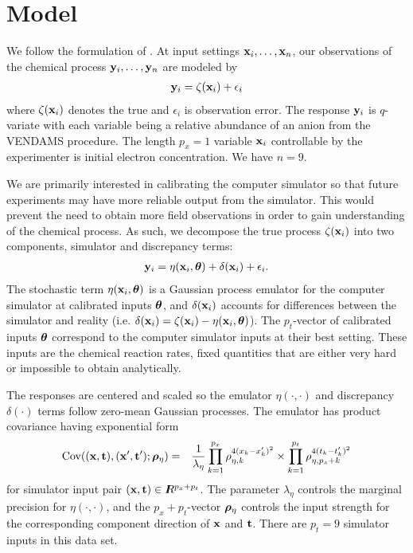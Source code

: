 \section{Model}

We follow the formulation of \cite{kennedy:2001}. At input settings $\mathbf{\bm{x}}_i,\ldots,\mathbf{\bm{x}}_n$, our observations of the chemical process $\mathbf{\bm{y}}_i,\ldots,\mathbf{\bm{y}}_n$ are modeled by
\begin{eqnarray}
\mathbf{\bm{y}}_i = \zeta(\mathbf{\bm{x}}_i) + \epsilon_i
\end{eqnarray}
where $\zeta(\mathbf{\bm{x}}_i)$ denotes the true and $\epsilon_i$ is observation error. The response $\mathbf{\bm{y}}_i$ is $q$-variate with each variable being a relative abundance of an anion from the VENDAMS procedure. The length $p_x=1$ variable $\mathbf{\bm{x}}_i$ controllable by the experimenter is initial electron concentration. We have $n=9$.

We are primarily interested in calibrating the computer simulator so that future experiments may have more reliable output from the simulator. This would prevent the need to obtain more field observations in order to gain understanding of the chemical process. As such, we decompose the true process $\zeta(\mathbf{\bm{x}}_i)$ into two components, simulator and discrepancy terms:
\begin{eqnarray}
\mathbf{\bm{y}}_i = \eta(\mathbf{\bm{x}}_i, \mathbf{\bm{\theta}}) + \delta(\mathbf{\bm{x}}_i) + \epsilon_i.
\end{eqnarray}
The stochastic term $\eta(\mathbf{\bm{x}}_i, \mathbf{\bm{\theta}})$ is a Gaussian process emulator for the computer simulator at calibrated inputs $\mathbf{\bm{\theta}}$, and $\delta(\mathbf{\bm{x}}_i)$ accounts for differences between the simulator and reality (i.e. $\delta(\mathbf{\bm{x}}_i) = \zeta(\mathbf{\bm{x}}_i) - \eta(\mathbf{\bm{x}}_i, \mathbf{\bm{\theta}})$). The $p_t$-vector of calibrated inputs $\mathbf{\bm{\theta}}$ correspond to the computer simulator inputs at their best setting. These inputs are the chemical reaction rates, fixed quantities that are either very hard or impossible to obtain analytically.

The responses are centered and scaled so the emulator $\eta(\cdot, \cdot)$ and discrepancy $\delta(\cdot)$ terms follow zero-mean Gaussian processes. The emulator has product covariance having exponential form
\begin{eqnarray}
\mathrm{Cov}((\mathbf{\bm{x}},\mathbf{\bm{t}}),(\mathbf{\bm{x}}',\mathbf{\bm{t}}'); \mathbf{\bm{\rho}}_\eta) &=& \frac{1}{\lambda_\eta}\prod_{k=1}^{p_x}\rho_{\eta,k}^{4(x_k-x_k')^2}\times\prod_{k=1}^{p_t}\rho_{\eta,p_x+k}^{4(t_k-t_k')^2}
\end{eqnarray}
for simulator input pair $(\mathbf{\bm{x}},\mathbf{\bm{t}})\in I\hspace{-4.4pt}R^{p_x+p_t}$. The parameter $\lambda_\eta$ controls the marginal precision for $\eta(\cdot, \cdot)$, and the $p_x+p_t$-vector $\mathbf{\bm{\rho}}_\eta$ controls the input strength for the corresponding component direction of $\mathbf{\bm{x}}$ and $\mathbf{\bm{t}}$. There are $p_t=9$ simulator inputs in this data set.

